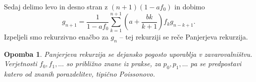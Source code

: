 \documentclass[10pt, a4paper]{article}
\newtheorem*{opomba}{Opomba}
\begin{document}
Sedaj delimo levo in desno stran z $(n + 1) (1 - af_0)$ in dobimo 
\begin{equation}
  g_{n + 1} = \frac{1}{1 - af_0} \sum_{k = 1} ^{n + 1} \left(a + \frac{bk}{k + 1}\right) f_k g_{n - k + 1}.
\end{equation}
Izpeljeli smo rekurzivno enačbo za $g_n$ -- tej rekurziji se reče Panjerjeva rekurzija.

\begin{opomba}
  Panjerjeva rekurzija se dejansko pogosto uporablja v zavarovalništvu.
  Verjetnosti $f_0, f_1, \dots$ so približno znane iz prakse, za $p_0, p_1, \dots$
  pa se predpostavi katero od znanih porazdelitev, tipično Poissonovo.
\end{opomba}
\end{document}

